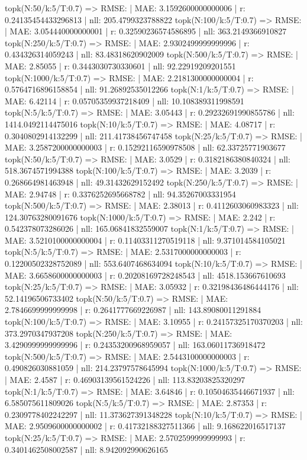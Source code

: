 topk(N:50/k:5/T:0.7) => RMSE: | MAE: 3.1592600000000006 | r: 0.24135454433296813 | nll: 205.4799323788822
topk(N:100/k:5/T:0.7) => RMSE: | MAE: 3.054440000000001 | r: 0.32590236574586895 | nll: 363.2149366910827
topk(N:250/k:5/T:0.7) => RMSE: | MAE: 2.9302499999999996 | r: 0.434326314059243 | nll: 83.48318620902009
topk(N:500/k:5/T:0.7) => RMSE: | MAE: 2.85055 | r: 0.3443030730330601 | nll: 92.22919209201551
topk(N:1000/k:5/T:0.7) => RMSE: | MAE: 2.2181300000000004 | r: 0.5764716896158854 | nll: 91.26892535012266
topk(N:1/k:5/T:0.7) => RMSE: | MAE: 6.42114 | r: 0.05705359937218409 | nll: 10.108389311998591
topk(N:5/k:5/T:0.7) => RMSE: | MAE: 3.05443 | r: 0.29232691990855786 | nll: 1414.0492114475016
topk(N:10/k:5/T:0.7) => RMSE: | MAE: 4.08717 | r: 0.3040802914132299 | nll: 211.41738456747458
topk(N:25/k:5/T:0.7) => RMSE: | MAE: 3.2587200000000003 | r: 0.15292116590978508 | nll: 62.33725771903677
topk(N:50/k:5/T:0.7) => RMSE: | MAE: 3.0529 | r: 0.3182186380840324 | nll: 518.3674571994388
topk(N:100/k:5/T:0.7) => RMSE: | MAE: 3.2039 | r: 0.268664981463948 | nll: 49.31432629152492
topk(N:250/k:5/T:0.7) => RMSE: | MAE: 2.94748 | r: 0.3376252695668782 | nll: 94.35267003331954
topk(N:500/k:5/T:0.7) => RMSE: | MAE: 2.38013 | r: 0.4112603060983323 | nll: 124.30763280091676
topk(N:1000/k:5/T:0.7) => RMSE: | MAE: 2.242 | r: 0.542378073286026 | nll: 165.06841832559007
topk(N:1/k:5/T:0.7) => RMSE: | MAE: 3.5210100000000004 | r: 0.11403311270519118 | nll: 9.371014584105021
topk(N:5/k:5/T:0.7) => RMSE: | MAE: 2.5317000000000003 | r: 0.12200502328752089 | nll: 553.6407468634094
topk(N:10/k:5/T:0.7) => RMSE: | MAE: 3.6658600000000003 | r: 0.20208169728248543 | nll: 4518.153667610693
topk(N:25/k:5/T:0.7) => RMSE: | MAE: 3.05932 | r: 0.32198436486444176 | nll: 52.14196506733402
topk(N:50/k:5/T:0.7) => RMSE: | MAE: 2.7846699999999998 | r: 0.2641777669226987 | nll: 143.89080011291884
topk(N:100/k:5/T:0.7) => RMSE: | MAE: 3.10955 | r: 0.24157325170370203 | nll: 373.2970347937208
topk(N:250/k:5/T:0.7) => RMSE: | MAE: 3.4290999999999996 | r: 0.24353200968959057 | nll: 163.06011736918472
topk(N:500/k:5/T:0.7) => RMSE: | MAE: 2.5443100000000003 | r: 0.490826030881059 | nll: 214.23797578645994
topk(N:1000/k:5/T:0.7) => RMSE: | MAE: 2.4587 | r: 0.46903139561524226 | nll: 113.83203825320297
topk(N:1/k:5/T:0.7) => RMSE: | MAE: 3.64846 | r: 0.10504635446671937 | nll: 6.585075611809026
topk(N:5/k:5/T:0.7) => RMSE: | MAE: 2.87353 | r: 0.2309778402242297 | nll: 11.373627391348228
topk(N:10/k:5/T:0.7) => RMSE: | MAE: 2.9509600000000002 | r: 0.41732188327511366 | nll: 9.168622016517137
topk(N:25/k:5/T:0.7) => RMSE: | MAE: 2.5702599999999993 | r: 0.3401462508002587 | nll: 8.942092990626165
